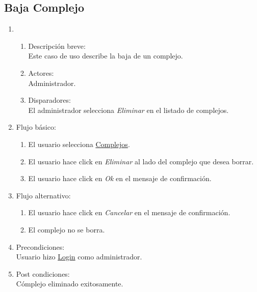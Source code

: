\documentclass[a4paper,11pt]{article}
\begin{document}
\subsection{Baja Complejo}
\begin{enumerate}

    \item
    \begin{enumerate}
    \item Descripci\'on breve: \\
        Este caso de uso describe la baja de un complejo.
    \item Actores: \\
        Administrador.
    \item Disparadores: \\
        El administrador selecciona \emph{Eliminar} en el listado de complejos.
    \end{enumerate} 
    \item Flujo b\'asico:
		\begin{enumerate}
        		\item El usuario selecciona \underline{Complejos}.
                        \item El usuario hace click en \emph{Eliminar} al lado del complejo que desea borrar.
			\item El usuario hace click en \emph{Ok} en el mensaje de confirmaci\'on.
		\end{enumerate}
	\item Flujo alternativo:
		\begin{enumerate}
		 \item El usuario hace click en \emph{Cancelar} en el mensaje de confirmaci\'on.
		 \item El complejo no se borra.
		\end{enumerate}

    \item Precondiciones: \\
        Usuario hizo \underline{Login} como administrador.

    \item Post condiciones: \\
        C\'omplejo eliminado exitosamente.
\end{enumerate}


\end{document}
